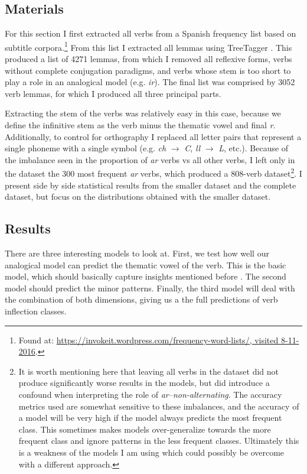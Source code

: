 \subsection{Materials}
\largerpage 
For this section I first extracted all verbs from a Spanish frequency list based on subtitle corpora.\footnote{Found at: \url{https://invokeit.wordpress.com/frequency-word-lists/, visited 8-11-2016}.} From this list I extracted all lemmas using TreeTagger \autocite{Schmid.1995a}. This produced a list of 4271 lemmas, from which I removed all reflexive forms, verbs without complete conjugation paradigms, and verbs whose stem is too short to play a role in an analogical model (e.g. \textit{ir}). The final list was comprised by 3052 verb lemmas, for which I produced all three principal parts.

Extracting the stem of the verbs was relatively easy in this case, because we define the infinitive stem as the verb minus the thematic vowel and final \textit{r}. Additionally, to control for orthography I replaced all letter pairs that represent a single phoneme with a single symbol (e.g. \textit{ch} $\rightarrow$ \textit{C}, \textit{ll} $\rightarrow$ \textit{L}, etc.). Because of the imbalance seen in the proportion of \textit{ar} verbs vs all other verbs, I left only in the dataset the 300 most frequent \textit{ar} verbs, which produced a 808-verb dataset\footnote{It is worth mentioning here that leaving all verbs in the dataset did not produce significantly worse results in the models, but did introduce a confound when interpreting the role of \textit{ar--non-alternating}. The accuracy metrics used are somewhat sensitive to these imbalances, and the accuracy of a model will be very high if the model always predicts the most frequent class. This sometimes makes models over-generalize towards the more frequent class and ignore patterns in the less frequent classes. Ultimately this is a weakness of the models I am using which could possibly be overcome with a different approach.}. I present side by side statistical results from the smaller dataset and the complete dataset, but focus on the distributions obtained with the smaller dataset.

\subsection{Results}

There are three interesting models to look at. First, we test how well our analogical model can predict the thematic vowel of the verb. This is the basic model, which should basically capture insights mentioned before \autocite{Boye.2004}. The second model should predict the minor patterns. Finally, the third model will deal with the combination of both dimensions, giving us a the full predictions of verb inflection classes.

